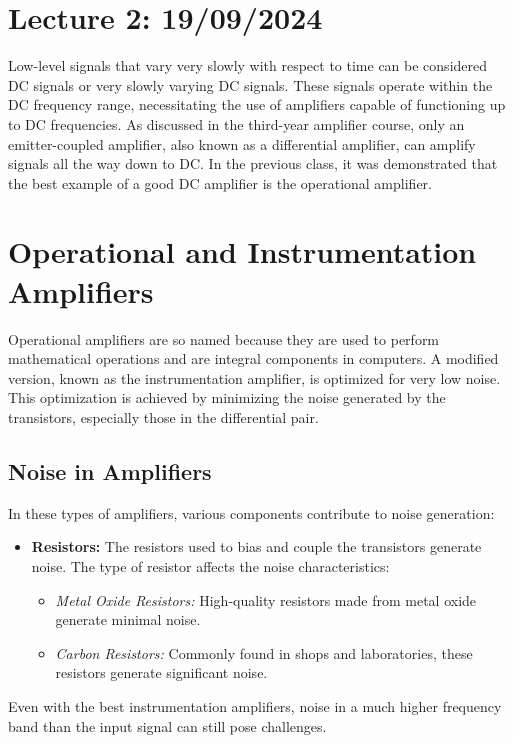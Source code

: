 
\section{Lecture 2: 19/09/2024}
Low-level signals that vary very slowly with respect to time can be considered DC signals or very slowly varying DC signals. These signals operate within the DC frequency range, necessitating the use of amplifiers capable of functioning up to DC frequencies. As discussed in the third-year amplifier course, only an emitter-coupled amplifier, also known as a differential amplifier, can amplify signals all the way down to DC. In the previous class, it was demonstrated that the best example of a good DC amplifier is the operational amplifier.

\section{Operational and Instrumentation Amplifiers}
Operational amplifiers are so named because they are used to perform mathematical operations and are integral components in computers. A modified version, known as the instrumentation amplifier, is optimized for very low noise. This optimization is achieved by minimizing the noise generated by the transistors, especially those in the differential pair.

\subsection{Noise in Amplifiers}
In these types of amplifiers, various components contribute to noise generation:
\begin{itemize}
    \item \textbf{Resistors:} The resistors used to bias and couple the transistors generate noise. The type of resistor affects the noise characteristics:
    \begin{itemize}
        \item \textit{Metal Oxide Resistors:} High-quality resistors made from metal oxide generate minimal noise.
        \item \textit{Carbon Resistors:} Commonly found in shops and laboratories, these resistors generate significant noise.
    \end{itemize}
\end{itemize}
Even with the best instrumentation amplifiers, noise in a much higher frequency band than the input signal can still pose challenges.

